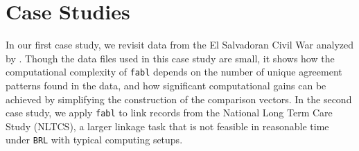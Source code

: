 \documentclass[ba]{imsart}
\begin{document}
	
	
	
	
	\section{Case Studies}
	\label{sec:case-studies}
	
	In our first case study, we revisit data from the El Salvadoran Civil War analyzed by \cite{sadinle_bayesian_2017}. Though the data files used in this case study are small, it shows how the computational complexity of \texttt{fabl} depends on the number of unique agreement patterns found in the data, and how significant computational gains can be achieved by simplifying the construction of the comparison vectors. In the second case study, we apply \texttt{fabl} to link records from the National Long Term Care Study (NLTCS), a larger linkage task that is not feasible in reasonable time under \texttt{BRL} with typical computing setups. 
	
\end{document}
